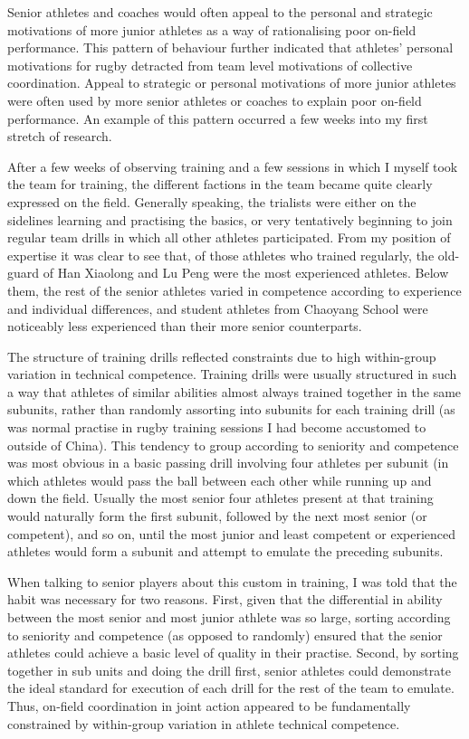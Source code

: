 \begin{CJK}{UTF8}{gbsn}

Senior athletes and coaches would often appeal to the personal and strategic motivations of more junior athletes as a way of rationalising poor on-field performance.  This pattern of behaviour further indicated that athletes' personal motivations for rugby detracted from team level motivations of collective coordination.
Appeal to strategic or personal motivations of more junior athletes were often used by more senior athletes or coaches to explain poor on-field performance.  An example of this pattern occurred a few weeks into my first stretch of research.

After a few weeks of observing training and a few sessions in which I myself took the team for training, the different factions in the team became quite clearly expressed on the field.  Generally speaking, the trialists were either on the sidelines learning and practising the basics, or very tentatively beginning to join regular team drills in which all other athletes participated.  From my position of expertise it was clear to see that, of those athletes who trained regularly, the old-guard of Han Xiaolong and Lu Peng were the most experienced athletes.  Below them, the rest of the senior athletes varied in competence according to experience and individual differences, and student athletes from Chaoyang School were noticeably less experienced than their more senior counterparts.

The structure of training drills reflected constraints due to high within-group variation in technical competence.  Training drills were usually structured in such a way that athletes of similar abilities almost always trained together in the same subunits, rather than randomly assorting into subunits for each training drill (as was normal practise in rugby training sessions I had become accustomed to outside of China).  This tendency to group according to seniority and competence was most obvious in a basic passing drill involving four athletes per subunit (in which athletes would pass the ball between each other while running up and down the field.  Usually the most senior four athletes present at that training would naturally form the first subunit, followed by the next most senior (or competent), and so on, until the most junior and least competent or experienced athletes would form a subunit and attempt to emulate the preceding subunits.

When talking to senior players about this custom in training, I was told that the habit was necessary for two reasons.  First, given that the differential in ability between the most senior and most junior athlete was so large, sorting according to seniority and competence (as opposed to randomly) ensured that the senior athletes could achieve a basic level of quality in their practise.  Second, by sorting together in sub units and doing the drill first, senior athletes could demonstrate the ideal standard for execution of each drill for the rest of the team to emulate.  Thus, on-field coordination in joint action appeared to be fundamentally constrained by within-group variation in athlete technical competence.


\end{CJK}
